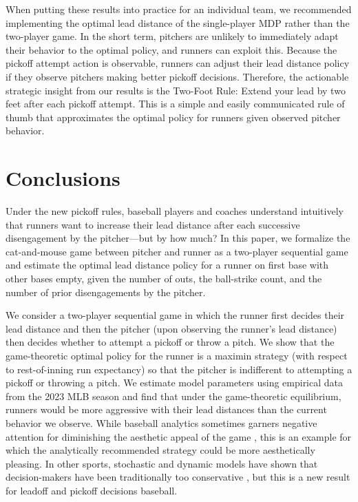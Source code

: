 \documentclass[opre,dblanonrev]{informs4}
\begin{document}
    When putting these results into practice for an individual team, we recommended implementing the optimal lead distance of the single-player MDP rather than the two-player game. In the short term, pitchers are unlikely to immediately adapt their behavior to the optimal policy, and runners can exploit this. Because the pickoff attempt action is observable, runners can adjust their lead distance policy if they observe pitchers making better pickoff decisions. Therefore, the actionable strategic insight from our results is the Two-Foot Rule: Extend your lead by two feet after each pickoff attempt. This is a simple and easily communicated rule of thumb that approximates the optimal policy for runners given observed pitcher behavior.
    
  \section{Conclusions}

    Under the new pickoff rules, baseball players and coaches understand intuitively that runners want to increase their lead distance after each successive disengagement by the pitcher---but by how much? In this paper, we formalize the cat-and-mouse game between pitcher and runner as a two-player sequential game and estimate the optimal lead distance policy for a runner on first base with other bases empty, given the number of outs, the ball-strike count, and the number of prior disengagements by the pitcher.

    We consider a two-player sequential game in which the runner first decides their lead distance and then the pitcher (upon observing the runner's lead distance) then decides whether to attempt a pickoff or throw a pitch. We show that the game-theoretic optimal policy for the runner is a maximin strategy (with respect to rest-of-inning run expectancy) so that the pitcher is indifferent to attempting a pickoff or throwing a pitch. We estimate model parameters using empirical data from the 2023 MLB season and find that under the game-theoretic equilibrium, runners would be more aggressive with their lead distances than the current behavior we observe. While baseball analytics sometimes garners negative attention for diminishing the aesthetic appeal of the game \citep{sheinin_analytics_2025}, this is an example for which the analytically recommended strategy could be more aesthetically pleasing. In other sports, stochastic and dynamic models have shown that decision-makers have been traditionally too conservative \citep{romer_firms_2006, beaudoin_strategies_2010, yam_what_2019}, but this is a new result for leadoff and pickoff decisions baseball.
\end{document}
